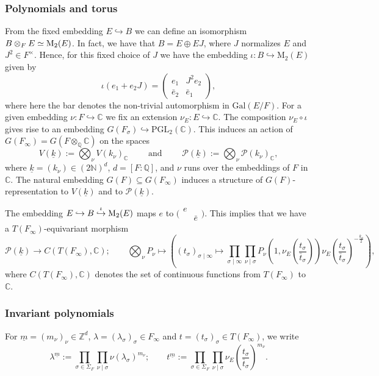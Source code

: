 \documentclass{amsart}
\theoremstyle{definition}
\theoremstyle{remark}
\numberwithin{equation}{section}
\newcommand{\ipa}[1]{\left(#1\right)}
\newcommand{\Gal}{{\mathrm {Gal}}}
\newcommand{\M}{\mathrm{M}}
\newcommand{\PGL}{{\mathrm{PGL}}}
\newcommand{\Z}{{\mathbb Z}}
\newcommand{\Q}{{\mathbb Q}}
\newcommand{\C}{{\mathbb C}}
\newcommand{\N}{{\mathbb N}}
\newcommand{\cP}{{\mathcal P}}
\begin{document}
\subsubsection{Polynomials and torus}\label{PolTorus}
From the fixed embedding $E\hookrightarrow B$ we can define an isomorphism $B\otimes_FE\simeq{\rm M}_2(E)$. In fact, we have that $B=E\oplus EJ$, where $J$ normalizes $E$ and $J^2\in F^\times$. Hence, for this fixed choice of $J$ we have the embedding $ \iota\colon   B\hookrightarrow\M_2(E)$ given by
\begin{equation}\label{embEinB}
\iota( e_1+e_2J)= \left(\begin{array}{cc}
    e_1 & J^2e_2 \\
    \bar e_2 & \bar e_1
\end{array}\right),
\end{equation}
where here the bar denotes the non-trivial automorphism in $\Gal(E/F)$.
For a given embedding $\nu:F\hookrightarrow\C$ we fix an extension $\nu_E\colon E\hookrightarrow\C$. The composition $\nu_E\circ \iota$ gives rise to an embedding  $G(F_\sigma)\hookrightarrow\PGL_2(\C)$. This induces an action of $G(F_\infty)=G(F\otimes_\Q\C)$ on the spaces
\[
V(\underline k):=\bigotimes_{\nu}V(k_{\nu})_\C \qquad\text{ and  }\qquad\cP(\underline k):=\bigotimes_{\nu}\cP(k_{\nu})_\C,
\]
where  $\underline k=(k_{\nu})\in (2\N)^d$, $d = [F\colon \Q]$, and $\nu$ runs over the embeddings of $F$ in $\C$. The natural embedding $G(F)\subseteq G(F_\infty)$ induces a structure of $G(F)$-representation to $V(\underline k)$ and to $ \cP(\underline k)$.

The embedding $  E\hookrightarrow B \stackrel{\iota}{\hookrightarrow}{\rm M}_2(E)$ maps $e$ to $\big(\begin{smallmatrix} e&\\&\bar e\end{smallmatrix}\big)$. This implies that we have a $T(F_\infty)$-equivariant morphism
\begin{equation}\label{PtoCoverC}
    \cP(\underline k)\longrightarrow C(T(F_\infty),\C);\qquad \bigotimes_{\nu} P_{\nu}\longmapsto\ipa{(t_\sigma)_{\sigma\mid\infty}\mapsto\prod_{\sigma\mid\infty}\prod_{\nu\mid\sigma}P_{\nu}\ipa{1,\nu_E\ipa{\frac{t_\sigma}{\bar t_\sigma}}}\nu_E\ipa{\frac{t_\sigma}{\bar t_\sigma}}^{-\frac{k_{\nu}}{2}}},
\end{equation}
where $ C(T(F_\infty),\C)$ denotes the set of continuous functions from $T(F_\infty)$ to $\C$.

\subsubsection{Invariant polynomials}\label{invpoly} For $\underline{m}=(m_{\nu})_{\nu}\in\Z^d$, $\lambda=(\lambda_\sigma)_\sigma\in F_\infty$ and $t=(t_\sigma)_\sigma\in T(F_\infty)$, we write 
\[
\lambda^{\underline{m}}:=\prod_{\sigma\in\Sigma_F}\prod_{\nu\mid\sigma} \nu(\lambda_\sigma)^{m_{\nu}};\qquad t^{\underline{m}}:=\prod_{\sigma\in\Sigma_F}\prod_{\nu\mid\sigma} \nu_E\ipa{\frac{t_\sigma}{\bar t_\sigma}}^{m_{\nu}}.
\]
\end{document}
